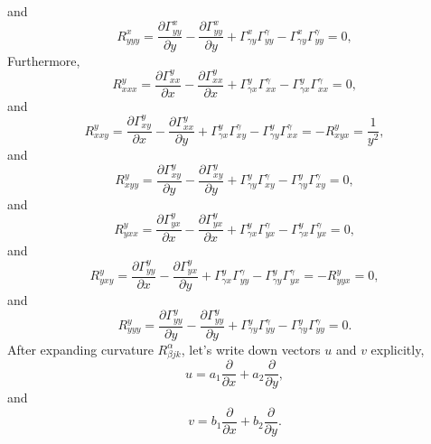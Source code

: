 \documentclass[11pt]{amsart}
\begin{document}
and
\begin{equation}
R_{yyy}^{x}=\frac{\partial \Gamma_{y y}^{x}}{\partial y}-\frac{\partial \Gamma_{y y}^{x}}{\partial y}+ \Gamma_{\gamma y}^{x} \Gamma_{y y}^{\gamma}- \Gamma_{\gamma y}^{x} \Gamma_{y y}^{\gamma}=0,
\end{equation}
Furthermore,
\begin{equation}
R_{xxx}^{y}=\frac{\partial \Gamma_{x x}^{y}}{\partial x}-\frac{\partial \Gamma_{x x}^{y}}{\partial x}+ \Gamma_{\gamma x}^{y} \Gamma_{x x}^{\gamma}- \Gamma_{\gamma x}^{y} \Gamma_{x x}^{\gamma}=0,
\end{equation}
and
\begin{equation}
R_{xxy}^{y}=\frac{\partial \Gamma_{x y}^{y}}{\partial x}-\frac{\partial \Gamma_{x x}^{y}}{\partial y}+ \Gamma_{\gamma x}^{y} \Gamma_{x y}^{\gamma}- \Gamma_{\gamma y}^{y} \Gamma_{x x}^{\gamma}=-R_{xyx}^{y}=\frac{1}{y^2},
\end{equation}
and
\begin{equation}
R_{xyy}^{y}=\frac{\partial \Gamma_{x y}^{y}}{\partial y}-\frac{\partial \Gamma_{x y}^{y}}{\partial y}+ \Gamma_{\gamma y}^{y} \Gamma_{x y}^{\gamma}- \Gamma_{\gamma y}^{y} \Gamma_{x y}^{\gamma}=0,
\end{equation}
and
\begin{equation}
R_{yxx}^{y}=\frac{\partial \Gamma_{y x}^{y}}{\partial x}-\frac{\partial \Gamma_{y x}^{y}}{\partial x}+ \Gamma_{\gamma x}^{y} \Gamma_{y x}^{\gamma}- \Gamma_{\gamma x}^{y} \Gamma_{y x}^{\gamma}=0,
\end{equation}
and
\begin{equation}
R_{yxy}^{y}=\frac{\partial \Gamma_{y y}^{y}}{\partial x}-\frac{\partial \Gamma_{y x}^{y}}{\partial y}+ \Gamma_{\gamma x}^{y} \Gamma_{y y}^{\gamma}- \Gamma_{\gamma y}^{y} \Gamma_{y x}^{\gamma}=-R_{yyx}^{y}=0,
\end{equation}
and
\begin{equation}
R_{yyy}^{y}=\frac{\partial \Gamma_{y y}^{y}}{\partial y}-\frac{\partial \Gamma_{y y}^{y}}{\partial y}+ \Gamma_{\gamma y}^{y} \Gamma_{y y}^{\gamma}- \Gamma_{\gamma y}^{y} \Gamma_{y y}^{\gamma}=0.
\end{equation}
After expanding curvature $R_{\beta jk}^{\alpha}$, let's write down vectors $u$ and $v$ explicitly,
\begin{equation}
u=a_1 \frac{\partial}{\partial x}+a_2 \frac{\partial}{\partial y},
\end{equation}
and 
\begin{equation}
v=b_1 \frac{\partial}{\partial x}+b_2 \frac{\partial}{\partial y}.
\end{equation}
\end{document}

